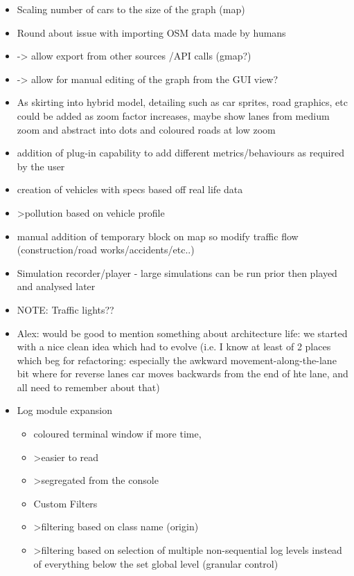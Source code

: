 \begin{itemize}
	\item Scaling number of cars to the size of the graph  (map)
	\item Round about issue with importing OSM data made by humans 
	\item -> allow export from other sources /API calls (gmap?)
	\item -> allow for manual editing of the graph from the GUI view?
	\item As skirting into hybrid model, detailing such as car sprites, road graphics, etc could be added as zoom factor increases, maybe show lanes from medium zoom and abstract into dots and coloured roads at low zoom
	\item addition of plug-in capability to add different metrics/behaviours as required by the user
	\item creation of vehicles with specs based off real life data
	\item >pollution based on vehicle profile
	\item manual addition of temporary block on map so modify traffic flow (construction/road works/accidents/etc..)
	\item Simulation recorder/player - large simulations can be run prior then played and analysed later
	\item NOTE: Traffic lights??
	\item Alex: would be good to mention something about architecture life: we started with a nice clean idea which had to evolve (i.e. I know at least of 2 places which beg for refactoring: especially the awkward movement-along-the-lane bit where for reverse lanes car moves backwards from the end of hte lane, and all need to remember about that)
\end{itemize}

\begin{itemize}
    \item Log module expansion
    \begin{itemize}
        \item coloured terminal window if more time,
        \item >easier to read
        \item >segregated from the console
        \item Custom Filters
        \item >filtering based on class name (origin)
        \item >filtering based on selection of multiple non-sequential log levels instead of everything below the set global level (granular control)
    \end{itemize}
\end{itemize}

